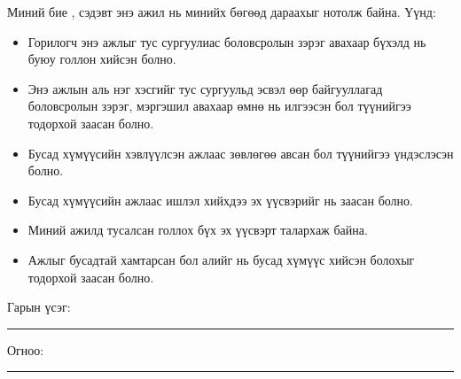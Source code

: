 \begin{declaration}
\addchaptertocentry{\authorshipname}

\noindent Миний бие \shortname, {\ttitle} сэдэвт энэ ажил нь минийх бөгөөд дараахыг нотолж байна. Үүнд:

\begin{itemize} 
\item Горилогч энэ ажлыг тус сургуулиас боловсролын зэрэг авахаар бүхэлд нь буюу голлон хийсэн болно.
\item Энэ ажлын аль нэг хэсгийг тус сургуульд эсвэл өөр байгууллагад боловсролын зэрэг, мэргэшил авахаар өмнө нь илгээсэн бол түүнийгээ тодорхой заасан болно.
\item Бусад хүмүүсийн хэвлүүлсэн ажлаас зөвлөгөө авсан бол түүнийгээ үндэслэсэн болно.
\item Бусад хүмүүсийн ажлаас ишлэл хийхдээ эх үүсвэрийг нь заасан болно.
\item Миний ажилд тусалсан голлох бүх эх үүсвэрт талархаж байна.
\item Ажлыг бусадтай хамтарсан бол алийг нь бусад хүмүүс хийсэн болохыг тодорхой заасан болно.
\end{itemize}
\bigskip
 
\noindent Гарын үсэг: \rule[-0.5em]{12.7em}{0.5pt}
\bigskip

\noindent Огноо: \rule[-0.5em]{15em}{0.5pt}

\end{declaration}

\clearpage

